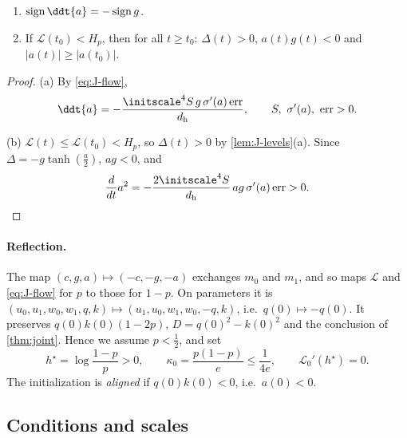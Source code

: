 \begin{lemma}
\label{lem:J-align}
\begin{enumerate}[label=(\alph*),leftmargin=*,itemsep=2pt,topsep=3pt]
\item $\operatorname{sign}\ddt{a}=-\operatorname{sign}g$.
\item If $\mathcal L(t_0)<H_p$, then for all $t\ge t_0$: $\Delta(t)>0$, $a(t)g(t)<0$ and $|a(t)|\ge|a(t_0)|$.
\end{enumerate}
\end{lemma}

\begin{proof}
(a) By \cref{eq:J-flow},
\[
 \ddt{a}=-\frac{\initscale^4S\,g\,\sigma'(a)\,\mathrm{err}}{d_{\mathrm h}},\qquad S,\ \sigma'(a),\ \mathrm{err}>0.
\]

(b) $\mathcal L(t)\le \mathcal L(t_0)<H_p$, so $\Delta(t)>0$ by \cref{lem:J-levels}(a). Since $\Delta=-g\tanh(\frac{a}{2})$, $ag<0$, and
\[
 \frac{d}{dt}a^2=-\frac{2\initscale^4S}{d_{\mathrm h}}\,ag\,\sigma'(a)\,\mathrm{err}>0 .
\qedhere
\]
\end{proof}

\paragraph{Reflection.} The map $(c,g,a)\mapsto(-c,-g,-a)$ exchanges $m_0$ and $m_1$, and so maps $\mathcal L$ and \cref{eq:J-flow} for $p$ to those for
$1-p$. On parameters it is $(u_0,u_1,w_0,w_1,q,k)\mapsto(u_1,u_0,w_1,w_0,-q,k)$, i.e.\ $q(0)\mapsto-q(0)$. It preserves $q(0)k(0)(1-2p)$, $D=q(0)^2-k(0)^2$
and the conclusion of \cref{thm:joint}. Hence we assume $p<\frac{1}{2}$, and set
\[
  h^\star=\log\frac{1-p}{p}>0,\qquad \kappa_0=\frac{p(1-p)}{e}\le\frac{1}{4e},\qquad  \mathcal L_0'( h^\star)=0 .
\]
The initialization is \emph{aligned} if $q(0)k(0)<0$, i.e.\ $a(0)<0$.

\subsection{Conditions and scales}
\label{app:J-constants}

